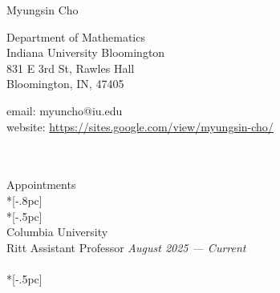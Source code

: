 \documentclass{article}
\begin{document}
\begin{center}
{\LARGE Myungsin Cho} \\[2pc]
\end{center}
\begin{minipage}[c]{0.4\linewidth}
Department of Mathematics\\ 
Indiana University Bloomington\\
831 E 3rd St, Rawles Hall \\
Bloomington, IN, 47405
\end{minipage} %
\begin{minipage}[c]{0.6\linewidth}
email:  myuncho@iu.edu \\
website: \url{https://sites.google.com/view/myungsin-cho/} \\
\\
\end{minipage}  \\[.5pc]

{\Large  Appointments} \\*[-.8pc]
\underline{\hspace{6.5in}} \\*[-.5pc]
\\
{ Columbia University}\\ 
{Ritt Assistant Professor} \hfill {\it  August 2025 — Current} \\
\\*[-.5pc]
\end{document}
